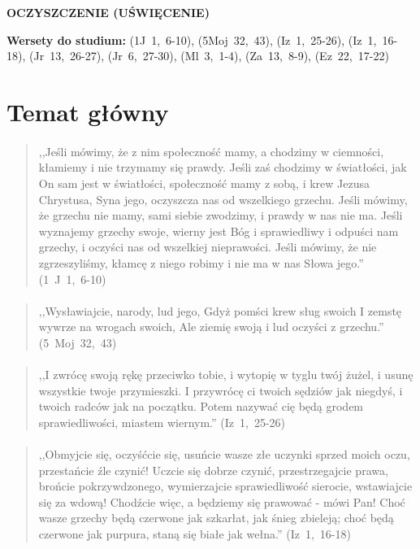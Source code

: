 \documentclass[10pt,a4paper,oneside]{article}
\begin{document}
\centerline{\textbf{\MakeUppercase{Oczyszczenie (uświęcenie)}}}
\begin{center}
\textbf{Wersety do studium:} \mbox{(1J 1, 6-10)}, \mbox{(5Moj 32, 43)}, \mbox{(Iz 1, 25-26)}, \mbox{(Iz 1, 16-18)}, \mbox{(Jr 13, 26-27)}, \mbox{(Jr 6, 27-30)}, \mbox{(Ml 3, 1-4)}, \mbox{(Za 13, 8-9)}, \mbox{(Ez 22, 17-22)}
\end{center}
\section{Temat główny}
\paragraph{}
\begin{quote}
,,Jeśli mówimy, że z nim społeczność mamy, a chodzimy w ciemności, kłamiemy i nie trzymamy się prawdy. Jeśli zaś chodzimy w światłości, jak On sam jest w światłości, społeczność mamy z sobą, i krew Jezusa Chrystusa, Syna jego, oczyszcza nas od wszelkiego grzechu. Jeśli mówimy, że grzechu nie mamy, sami siebie zwodzimy, i prawdy w nas nie ma. Jeśli wyznajemy grzechy swoje, wierny jest Bóg i sprawiedliwy i odpuści nam grzechy, i oczyści nas od wszelkiej nieprawości. Jeśli mówimy, że nie zgrzeszyliśmy, kłamcę z niego robimy i nie ma w nas Słowa jego.'' \mbox{(1 J 1, 6-10)}
\end{quote}
\paragraph{}
\begin{quote}
,,Wysławiajcie, narody, lud jego, Gdyż pomści krew sług swoich I zemstę wywrze na wrogach swoich, Ale ziemię swoją i lud oczyści z grzechu.'' \mbox{(5 Moj 32, 43)}
\end{quote}
\paragraph{}
\begin{quote}
,,I zwrócę swoją rękę przeciwko tobie, i wytopię w tyglu twój żużel, i usunę wszystkie twoje przymieszki. I przywrócę ci twoich sędziów jak niegdyś, i twoich radców jak na początku. Potem nazywać cię będą grodem sprawiedliwości, miastem wiernym.'' \mbox{(Iz 1, 25-26)}
\end{quote}
\paragraph{}
\begin{quote}
,,Obmyjcie się, oczyśćcie się, usuńcie wasze złe uczynki sprzed moich oczu, przestańcie źle czynić! Uczcie się dobrze czynić, przestrzegajcie prawa, brońcie pokrzywdzonego, wymierzajcie sprawiedliwość sierocie, wstawiajcie się za wdową! Chodźcie więc, a będziemy się prawować - mówi Pan! Choć wasze grzechy będą czerwone jak szkarłat, jak śnieg zbieleją; choć będą czerwone jak purpura, staną się białe jak wełna.'' \mbox{(Iz 1, 16-18)}
\end{quote}
\end{document}
